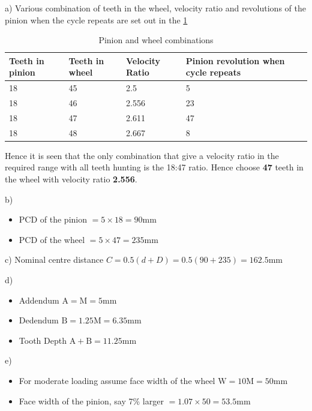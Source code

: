 a) Various combination of teeth in the wheel, velocity ratio and revolutions of the pinion when the cycle repeats are set out in the \cref{tbl-3}

\begin{table}[h]
  \caption{Pinion and wheel combinations}
  \label{tbl-3}
  \center
  \begin{tabular}{p{} p{} p{} p{}}
    \toprule
    Teeth in pinion & Teeth in wheel & Velocity Ratio & Pinion revolution when cycle repeats \\
    \midrule
    18 & 45 & 2.5 & 5 \\
    18 & 46 & 2.556 & 23 \\
    18 & 47 & 2.611 & 47 \\
    18 & 48 & 2.667 & 8 \\
    \bottomrule
  \end{tabular}
\end{table}

Hence it is seen that the only combination that give a velocity ratio in the required range with all teeth hunting is the 18:47 ratio. Hence choose \textbf{47} teeth in the wheel with velocity ratio \textbf{2.556}.

\noindent{} b)

\begin{itemize}
  \item PCD of the pinion $= 5 \times 18 = 90\si{\milli\metre}$
  \item PCD of the wheel $= 5 \times 47 = 235\si{\milli\metre}$
\end{itemize}

\noindent{} c) Nominal centre distance $C = 0.5(d+D) = 0.5(90+235)=162.5\si{\milli\metre}$

\noindent{} d)
\begin{itemize}
  \item Addendum $\text{A} = \text{M} = 5\si{\milli\metre}$
  \item Dedendum $\text{B} = 1.25\text{M} = 6.35\si{\milli\metre}$
  \item Tooth Depth $\text{A} + \text{B} = 11.25\si{\milli\metre}$
\end{itemize}

\noindent{} e)
\begin{itemize}
  \item For moderate loading assume face width of the wheel $\text{W}=10\text{M}=50\si{\milli\metre}$
  \item Face width of the pinion, say 7\% larger $= 1.07 \times 50 = 53.5\si{\milli\metre}$
\end{itemize}

